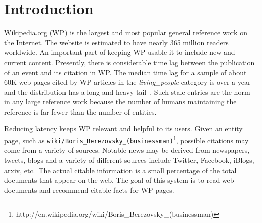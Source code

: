 
\section{Introduction}

Wikipedia.org (WP) is the largest and most popular general reference work on the Internet.
The website is estimated to have nearly 365 million readers worldwide.
An important part of keeping WP usable it to include new and current content.
Presently, there is considerable time lag between the publication of an event and its citation in WP\@.
The median time lag for a sample of about 60K web pages cited by WP articles in the \textit{living\_people} category is over a year and the distribution has a long and heavy tail~\cite{JFrank12}.
Such stale entries are the norm in any large reference work because the number
of humans maintaining the reference is far fewer than the number of entities.

Reducing latency keeps WP relevant and helpful to its users.
Given an entity page, such as \texttt{wiki/Boris\_Berezovsky\_(businessman)}\footnote{http://en.wikipedia.org/wiki/Boris\_Berezovsky\_(businessman)},
possible citations may come from a variety of sources.
Notable news may be derived from newspapers, tweets, blogs and a variety of
different sources include Twitter, Facebook, iBlogs, arxiv, etc.\
The actual citable information is a small percentage of the total documents that appear on the web.
The goal of this system is to read web documents and recommend citable facts for WP pages.



